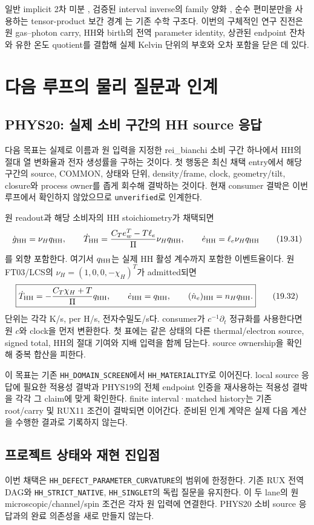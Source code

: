일반 implicit 2차 미분 \cite{SLN15},
검증된 interval inverse의 family 양화 \cite{R99},
순수 편미분만을 사용하는 tensor-product 보간 경계 \cite{MR09}는
기존 수학 구조다.
이번의 구체적인 연구 진전은 원 gas--photon carry,
HH와 birth의 전역 parameter identity,
상관된 endpoint 잔차와 유한 온도 quotient를 결합해
실제 Kelvin 단위의 부호와 오차 포함을 닫은 데 있다.

\section{다음 루프의 물리 질문과 인계}
\subsection{PHYS20: 실제 소비 구간의 HH source 응답}
다음 목표는 실제로 이름과 원 입력을 지정한
rei\_bianchi 소비 구간 하나에서
HH의 절대 열 변화율과 전자 생성률을 구하는 것이다.
첫 행동은 최신 채택 entry에서 해당 구간의 source,
COMMON, 상태와 단위, density/frame, clock,
geometry/tilt, closure와 process owner를 좁게 회수해 결박하는 것이다.
현재 consumer 결박은 이번 루프에서 확인하지 않았으므로
\texttt{unverified}로 인계한다.

원 readout과 해당 소비자의 HH stoichiometry가 채택되면
\[
\dot g_{\rm HH}=\nu_Hq_{\rm HH},\qquad
\dot T_{\rm HH}
=\frac{C_Te_w^T-T\ell_e}{\Pi}\nu_Hq_{\rm HH},\qquad
\dot e_{\rm HH}=\ell_e\nu_Hq_{\rm HH}
\tag{19.31}
\]
를 외향 포함한다.
여기서 $q_{\rm HH}$는 실제 HH 활성 계수까지 포함한 이벤트율이다.
원 FT03/LCS의 $\nu_H=(1,0,0,-\chi_H)^T$가 admitted되면
\[
\boxed{\dot T_{\rm HH}
=-\frac{C_T\chi_H+T}{\Pi}q_{\rm HH},\qquad
\dot e_{\rm HH}=q_{\rm HH},\qquad
(\dot n_e)_{\rm HH}=n_Hq_{\rm HH}.}
\tag{19.32}
\]
단위는 각각 K/s, per H/s, 전자수밀도/s다.
consumer가 $c^{-1}\partial_t$ 정규화를 사용한다면 원 $c$와 clock을 먼저 변환한다.
첫 표에는 같은 상태의 다른 thermal/electron source, signed total,
HH의 절대 기여와 지배 입력을 함께 담는다.
source ownership을 확인해 중복 합산을 피한다.

이 목표는 기존 \texttt{HH\_DOMAIN\_SCREEN}에서
\texttt{HH\_MATERIALITY}로 이어진다.
local source 응답에 필요한 적용성 결박과
PHYS19의 전체 endpoint 인증을 재사용하는 적용성 결박을 각각 그 claim에 맞게 확인한다.
finite interval·matched history는 기존 root/carry 및 RUX11 조건이 결박되면 이어간다.
준비된 인계 계약은 실제 다음 계산을 수행한 결과로 기록하지 않는다.

\subsection{프로젝트 상태와 재현 진입점}
이번 채택은 \texttt{HH\_DEFECT\_PARAMETER\_CURVATURE}의 범위에 한정한다.
기존 RUX 전역 DAG와
\texttt{HH\_STRICT\_NATIVE}, \texttt{HH\_SINGLET}의 독립 질문을 유지한다.
이 두 lane의 원 microscopic/channel/spin 조건은 각자 원 입력에 연결한다.
PHYS20 소비 source 응답과의 완료 의존성을 새로 만들지 않는다.

